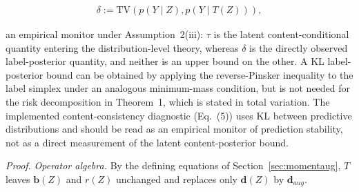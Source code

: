 \documentclass[electronics,article,submit,moreauthors]{Definitions/mdpi}
\newcommand{\add}[1]{\textcolor{addblue}{#1}}
\newcommand{\del}[1]{\textcolor{delred}{\st{#1}}}
\newcommand{\delmath}[1]{\textcolor{delred}{\cancel{#1}}}
\def\add#1{#1}
\def\del#1{}
\def\delmath#1{}
\begin{document}
\begin{itemize}[leftmargin=2.7em,labelwidth=2.3em,labelsep=0.4em,align=left]
\begin{equation}
\begin{gathered}
\delmath{\mathrm{TV}\!\left(p(Y\mid Z),\,p(Y\mid T(Z))\right)\le \tau+\delta=:\varepsilon(\delta,\tau),}\\
\add{\delta:=\mathrm{TV}\!\left(p(Y\mid Z),p(Y\mid T(Z))\right),}
\end{gathered}
\label{eq:labeltv}
\end{equation}
\del{so that both bounds vanish as \mbox{$\tau,\delta\to0$}. A KL label-posterior bound follows from \mbox{\eqref{eq:klcorollary}} applied to the label simplex under an analogous minimum-mass condition, but is not needed for the risk decomposition in Theorem~1, which is stated in total variation. The implemented content-consistency diagnostic (Eq.~(5)) uses KL between predictive distributions and should be read as an empirical monitor of prediction stability, not as a direct measurement of the latent content-posterior bound \mbox{\eqref{eq:tvbound}}.}
\add{an empirical monitor under Assumption~2(iii): $\tau$ is the latent content-conditional quantity entering the distribution-level theory, whereas $\delta$ is the directly observed label-posterior quantity, and neither is an upper bound on the other. A KL label-posterior bound can be obtained by applying the reverse-Pinsker inequality to the label simplex under an analogous minimum-mass condition, but is not needed for the risk decomposition in Theorem~1, which is stated in total variation. The implemented content-consistency diagnostic (Eq.~(5)) uses KL between predictive distributions and should be read as an empirical monitor of prediction stability, not as a direct measurement of the latent content-posterior bound.}
\end{itemize}

\noindent\textit{Proof.}
\emph{Operator algebra.} By the defining equations of Section~\ref{sec:momentaug}, $T$ leaves $\mathbf{b}(Z)$ and $r(Z)$ unchanged and replaces only $\mathbf{d}(Z)$ by $\mathbf{d}_{aug}$.
\end{document}
